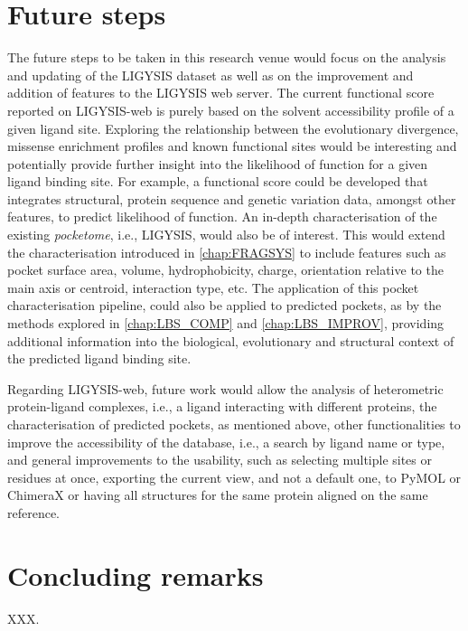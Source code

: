 \section{Future steps}

The future steps to be taken in this research venue would focus on the analysis and updating of the LIGYSIS dataset as well as on the improvement and addition of features to the LIGYSIS web server. The current functional score reported on LIGYSIS-web is purely based on the solvent accessibility profile of a given ligand site. Exploring the relationship between the evolutionary divergence, missense enrichment profiles and known functional sites would be interesting and potentially provide further insight into the likelihood of function for a given ligand binding site. For example, a functional score could be developed that integrates structural, protein sequence and genetic variation data, amongst other features, to predict likelihood of function. An in-depth characterisation of the existing \textit{pocketome}, i.e., LIGYSIS, would also be of interest. This would extend the characterisation introduced in \autoref{chap:FRAGSYS} to include features such as pocket surface area, volume, hydrophobicity, charge, orientation relative to the main axis or centroid, interaction type, etc. The application of this pocket characterisation pipeline, could also be applied to predicted pockets, as by the methods explored in \autoref{chap:LBS_COMP} and \autoref{chap:LBS_IMPROV}, providing additional information into the biological, evolutionary and structural context of the predicted ligand binding site.

Regarding LIGYSIS-web, future work would allow the analysis of heterometric protein-ligand complexes, i.e., a ligand interacting with different proteins, the characterisation of predicted pockets, as mentioned above, other functionalities to improve the accessibility of the database, i.e., a search by ligand name or type, and general improvements to the usability, such as selecting multiple sites or residues at once, exporting the current view, and not a default one, to PyMOL \cite{SCHRODINGER_2015_PYMOL} or ChimeraX \cite{PETTERSEN_2021_CHIMERAX} or having all structures for the same protein aligned on the same reference.

\section{Concluding remarks}

XXX.